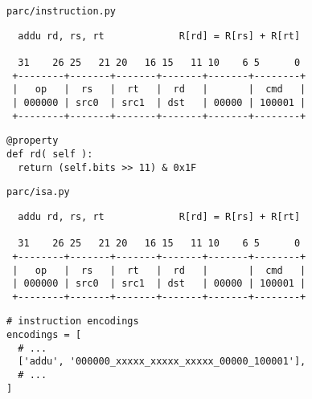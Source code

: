\begin{frame}[fragile]{\texttt{parc/instruction.py}}

\begin{verbatim}
  addu rd, rs, rt             R[rd] = R[rs] + R[rt]

  31    26 25   21 20   16 15   11 10    6 5      0
 +--------+-------+-------+-------+-------+--------+
 |   op   |  rs   |  rt   |  rd   |       |  cmd   |
 | 000000 | src0  | src1  | dst   | 00000 | 100001 |
 +--------+-------+-------+-------+-------+--------+

\end{verbatim}

\begin{lstlisting}
@property
def rd( self ):
  return (self.bits >> 11) & 0x1F
\end{lstlisting}
\end{frame}


\begin{frame}[fragile]{\texttt{parc/isa.py}}

\begin{verbatim}
  addu rd, rs, rt             R[rd] = R[rs] + R[rt]

  31    26 25   21 20   16 15   11 10    6 5      0
 +--------+-------+-------+-------+-------+--------+
 |   op   |  rs   |  rt   |  rd   |       |  cmd   |
 | 000000 | src0  | src1  | dst   | 00000 | 100001 |
 +--------+-------+-------+-------+-------+--------+

\end{verbatim}

\vspace{-30pt}

\begin{lstlisting}
# instruction encodings
encodings = [
  # ...
  ['addu', '000000_xxxxx_xxxxx_xxxxx_00000_100001'],
  # ...
]
\end{lstlisting}
\end{frame}


